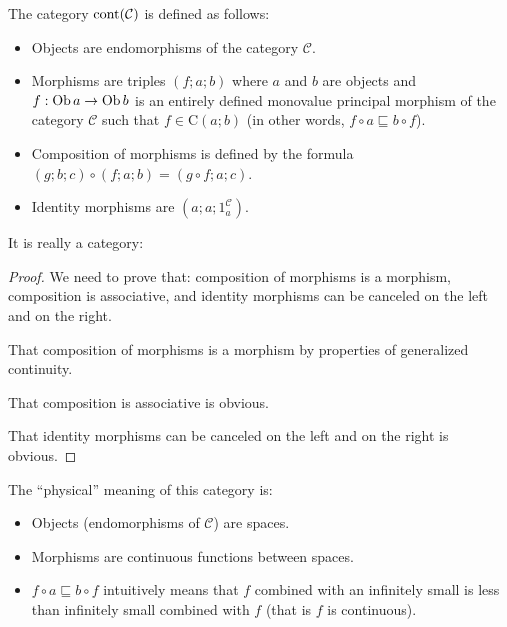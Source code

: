\begin{defn}
  The category $\operatorname{cont} (\mathcal{C})$ is defined as follows:
  \begin{itemize}
    \item Objects are endomorphisms of the category $\mathcal{C}$.
    
    \item Morphisms are triples $(f ; a ; b)$ where $a$ and $b$ are objects
    and $f : \operatorname{Ob} a \rightarrow \operatorname{Ob} b$ is an entirely defined
    monovalue principal morphism of the category $\mathcal{C}$ such that $f
    \in \mathrm{C} (a ; b)$ (in other words, $f \circ a \sqsubseteq b \circ
    f$).
    
    \item Composition of morphisms is defined by the formula $(g ; b ; c)
    \circ (f ; a ; b) = (g \circ f ; a ; c)$.
    
    \item Identity morphisms are $(a ; a ; 1^{\mathcal{C}}_a)$.
  \end{itemize}
\end{defn}

It is really a category:

\begin{proof}
  We need to prove that: composition of morphisms is a morphism, composition
  is associative, and identity morphisms can be canceled on the left and on
  the right.
  
  That composition of morphisms is a morphism by properties of generalized
  continuity.
  
  That composition is associative is obvious.
  
  That identity morphisms can be canceled on the left and on the right is
  obvious.
\end{proof}

\begin{rem}
  The ``physical'' meaning of this category is:
  \begin{itemize}
    \item Objects (endomorphisms of $\mathcal{C}$) are spaces.
    
    \item Morphisms are continuous functions between spaces.
    
    \item $f \circ a \sqsubseteq b \circ f$ intuitively means that $f$
    combined with an infinitely small is less than infinitely small combined
    with $f$ (that is $f$ is continuous).
  \end{itemize}
\end{rem}

